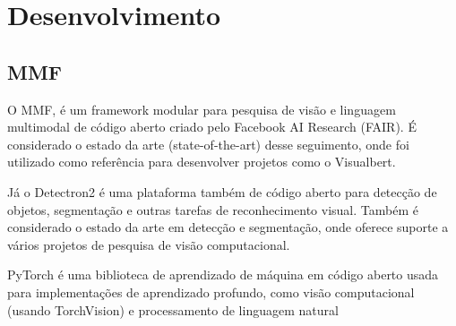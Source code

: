 







\chapter{Desenvolvimento}
\label{cap:03}

\section{MMF}

O MMF, é um framework modular para pesquisa de visão e linguagem multimodal de código aberto criado pelo Facebook AI Research (FAIR). É considerado o estado da arte (state-of-the-art) desse seguimento, onde foi utilizado como referência para desenvolver projetos como o Visualbert.

Já o Detectron2 é uma plataforma também de código aberto para detecção de objetos, segmentação e outras tarefas de reconhecimento visual. Também é considerado o estado da arte em detecção e segmentação, onde oferece suporte a vários projetos de pesquisa de visão computacional.

PyTorch é uma biblioteca de aprendizado de máquina em código aberto usada para implementações de aprendizado profundo, como visão computacional (usando TorchVision) e processamento de linguagem natural

